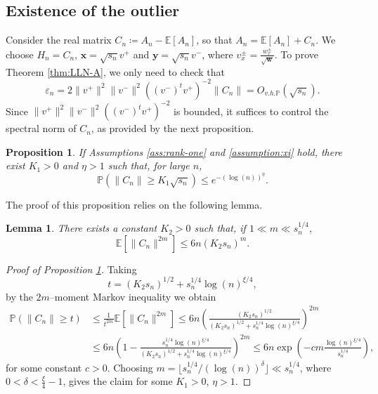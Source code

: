 \documentclass[11pt,oneside]{amsart}
\theoremstyle{plain}
\newtheorem{lemma}[theorem]{Lemma}
\newtheorem{proposition}[theorem]{Proposition}
\numberwithin{equation}{section}
\newcommand{\eps}{\varepsilon}
\newcommand{\E}{\mathbb{E}}
\newcommand{\p}{\mathbb{P}}
\newcommand{\centered}{C_n}
\newcommand{\w}{\boldsymbol{w}}
\newcommand{\x}{{{v}}^+}
\newcommand{\y}{{{v}}^-}
\newcommand{\xx}{\boldsymbol{x}}
\newcommand{\yy}{\boldsymbol{y}}
\newcommand{\scaling}{s_n}
\newcommand{\Ohp}{O_{v.h.\p}}
\begin{document}
 \subsection{Existence of the outlier}
 \label{subsec:existence-outlier}
 Consider the real matrix $\centered \coloneq A_n-\E[A_n]$, so that $A_n=\E[A_n]+\centered$.
We choose $H_n=\centered$,
$\xx = \sqrt{\scaling} v^+$ and $\yy=\sqrt{\scaling} v^-$, where $v^\pm_x=\frac{w^\pm_x}{\sqrt{\w}}$. To prove Theorem \ref{thm:LLN-A}, we only need to check that $$\eps_n=2 \|\x\|^2\|\y\|^2((\y)^t\x)^{-2}\|\centered \|= \Ohp(\sqrt{\scaling}).$$
Since $\|\x\|^2 \|\y\|^2 ((\y)^t\x)^{-2}$ is bounded, it suffices to control the spectral norm of $\centered$, as provided by the next proposition.
\begin{proposition}
\label{prop:prop-W}
If Assumptions \ref{ass:rank-one} and \ref{assumption:xi} hold, there exist $K_1>0$ and $\eta>1$ such that, for large $n$,
\begin{equation}
    \p\left(\|\centered\|\ge K_1\sqrt{\scaling}\right)\le e^{-(\log(n))^{\eta}}.
\end{equation}
\end{proposition}
The proof of this proposition relies on the following lemma.
\begin{lemma} \label{lem:lem-W}
There exists a constant $K_2>0$ such that, if  $1\ll m \ll \scaling^{1/4}$, 
    \begin{equation} \label{eq:claim-W}
    \E[\|\centered\|^{2m}]\le6n \left({K_2 \scaling}\right)^m.
\end{equation}
\end{lemma}
\begin{proof}[Proof of Proposition \ref{prop:prop-W}]
Taking $$t={\left({K_2 \scaling}\right)^{1/2}}+\scaling^{1/4}\log(n)^{\xi/4},$$ by the $2m$--moment Markov  inequality we obtain
\begin{equation} 
\begin{split}
    \p(\|\centered\|\ge t ) &\le \frac1 {t^{2m}}{\E[\|\centered\|^{2m}]} \le 6n \left(\frac{\left({K_2 \scaling}\right)^{1/2}}{{\left({K_2 \scaling}\right)^{1/2}}+\scaling^{1/4}\log(n)^{\xi/4}}\right)^{2m} \\
    &\le 6n \left(1-\frac{\scaling^{1/4}\log(n)^{\xi/4}}{{\left({K_2 \scaling}\right)^{1/2}}+\scaling^{1/4}\log(n)^{\xi/4}}\right)^{2m} 
    \le  6n \exp\left(- c m \frac{\log(n)^{\xi/4}}{\scaling^{1/4}}\right),
    \end{split}
\end{equation}
for some constant $c>0$. Choosing $m=\lfloor\scaling^{1/4}/(\log(n))^{\delta}\rfloor\ll \scaling^{1/4}$, where $0<\delta<\frac{\xi}{4}-1$, gives the claim for some $K_1>0$, $\eta>1$.
\end{proof}
\end{document}
